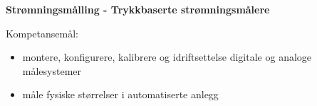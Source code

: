 \centerline{\bf Strømningsmålling - Trykkbaserte strømningsmålere}  \bigskip

Kompetansemål:
\begin{itemize}[noitemsep]

	\item montere, konfigurere, kalibrere og idriftsettelse digitale og analoge målesystemer
	\item måle fysiske størrelser i automatiserte anlegg
\end{itemize}
\vskip 2cm
